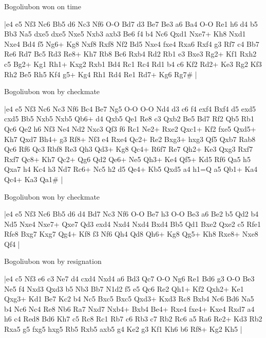 \showboard

Bogoliubon won on time

\makegametitle
|e4 e5 Nf3 Nc6 Bb5 d6 Nc3 Nf6 O-O Bd7 d3 Be7 Be3 a6 Ba4 O-O Re1 h6 d4 b5 Bb3 Na5 dxe5 dxe5 Nxe5 Nxb3 axb3 Be6 f4 b4 Nc6 Qxd1 Nxe7+ Kh8 Nxd1 Nxe4 Bd4 f5 Ng6+ Kg8 Nxf8 Rxf8 Nf2 Bd5 Nxe4 fxe4 Rxa6 Rxf4 g3 Rf7 c4 Bb7 Re6 Rd7 Bc5 Rd3 Re8+ Kh7 Rb8 Bc6 Rxb4 Rd2 Rb1 e3 Bxe3 Rg2+ Kf1 Rxh2 c5 Bg2+ Kg1 Rh1+ Kxg2 Rxb1 Bd4 Rc1 Rc4 Rd1 b4 c6 Kf2 Rd2+ Ke3 Rg2 Kf3 Rh2 Be5 Rh5 Kf4 g5+ Kg4 Rh1 Rd4 Re1 Rd7+ Kg6 Rg7\#  |

\showboard

Bogoliubon won by checkmate

\makegametitle
|e4 e5 Nf3 Nc6 Nc3 Nf6 Bc4 Be7 Ng5 O-O O-O Nd4 d3 c6 f4 exf4 Bxf4 d5 exd5 cxd5 Bb5 Nxb5 Nxb5 Qb6+ d4 Qxb5 Qe1 Re8 c3 Qxb2 Be5 Bd7 Rf2 Qb5 Rb1 Qc6 Qe2 h6 Nf3 Ne4 Nd2 Nxc3 Qf3 f6 Rc1 Ne2+ Rxe2 Qxc1+ Kf2 fxe5 Qxd5+ Kh7 Qxd7 Bh4+ g3 Rf8+ Nf3 e4 Rxe4 Qc2+ Re2 Bxg3+ hxg3 Qf5 Qxb7 Rab8 Qc6 Rf6 Qc3 Rbf8 Re3 Qh3 Qd3+ Kg8 Qc4+ R6f7 Re7 Qh2+ Ke3 Qxg3 Rxf7 Rxf7 Qc8+ Kh7 Qc2+ Qg6 Qd2 Qe6+ Ne5 Qh3+ Ke4 Qf5+ Kd5 Rf6 Qa5 h5 Qxa7 h4 Kc4 h3 Nd7 Rc6+ Nc5 h2 d5 Qe4+ Kb5 Qxd5 a4 h1=Q a5 Qb1+ Ka4 Qc4+ Ka3 Qa1\#  |

\showboard

Bogoliubon won by checkmate

\makegametitle
|e4 e5 Nf3 Nc6 Bb5 d6 d4 Bd7 Nc3 Nf6 O-O Be7 h3 O-O Be3 a6 Be2 b5 Qd2 b4 Nd5 Nxe4 Nxe7+ Qxe7 Qd3 exd4 Nxd4 Nxd4 Bxd4 Bb5 Qd1 Bxe2 Qxe2 c5 Rfe1 Rfe8 Bxg7 Kxg7 Qg4+ Kf8 f3 Nf6 Qh4 Qd8 Qh6+ Kg8 Qg5+ Kh8 Rxe8+ Nxe8 Qf4  |

\showboard

Bogoliubon won by resignation

\makegametitle
|e4 c5 Nf3 e6 c3 Ne7 d4 cxd4 Nxd4 a6 Bd3 Qc7 O-O Ng6 Re1 Bd6 g3 O-O Be3 Ne5 f4 Nxd3 Qxd3 b5 Nb3 Bb7 N1d2 f5 e5 Qc6 Re2 Qh1+ Kf2 Qxh2+ Ke1 Qxg3+ Kd1 Be7 Kc2 b4 Nc5 Bxc5 Bxc5 Qxd3+ Kxd3 Rc8 Bxb4 Nc6 Bd6 Na5 b4 Nc6 Nc4 Re8 Nb6 Ra7 Nxd7 Nxb4+ Bxb4 Be4+ Rxe4 fxe4+ Kxe4 Rxd7 a4 h6 c4 Red8 Bd6 Kh7 c5 Rc8 Rc1 Rb7 c6 Rb3 c7 Rb2 Rc6 a5 Ra6 Re2+ Kd3 Rb2 Rxa5 g5 fxg5 hxg5 Rb5 Rxb5 axb5 g4 Ke2 g3 Kf1 Kh6 b6 Rf8+ Kg2 Kh5  |

\showboard

